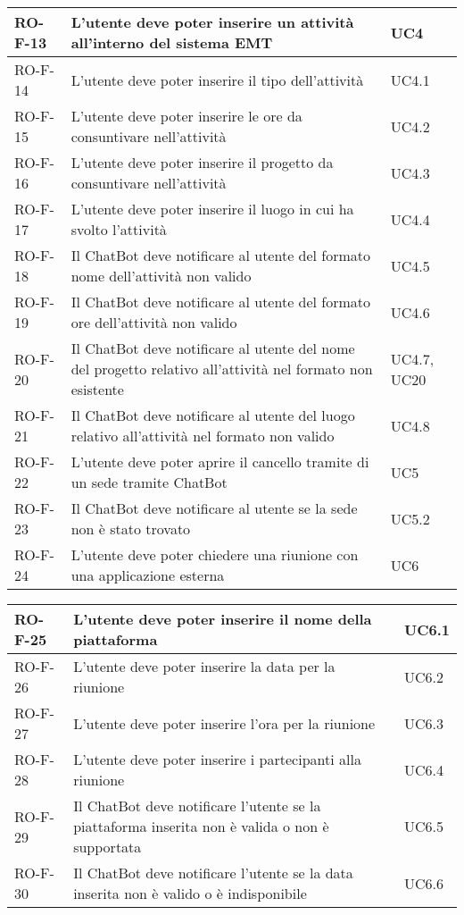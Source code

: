 \begin{center}
\begin{tabular}{ | m{8em} | m{18em} | m{12em} | }
\hline
RO-F-13&L’utente deve poter inserire un attività all’interno del sistema EMT &UC4 \\
\hline
RO-F-14&L’utente deve poter inserire il tipo dell’attività &UC4.1 \\
\hline
RO-F-15&L’utente deve poter inserire le ore da consuntivare nell’attività &UC4.2 \\
\hline  
RO-F-16&L’utente deve poter inserire il progetto da consuntivare nell’attività &UC4.3 \\
\hline
RO-F-17&L’utente deve poter inserire il luogo in cui ha svolto l’attività &UC4.4 \\
\hline
RO-F-18&Il ChatBot deve notificare al utente del formato nome dell’attività non valido &UC4.5 \\
\hline
RO-F-19&Il ChatBot deve notificare al utente del formato ore dell’attività non valido &UC4.6 \\
\hline
RO-F-20&Il ChatBot deve notificare al utente del nome del progetto relativo all’attività  nel formato non esistente &UC4.7, UC20 \\
\hline
RO-F-21&Il ChatBot deve notificare al utente del luogo relativo all’attività nel formato non valido &UC4.8 \\
\hline
RO-F-22&L’utente deve poter aprire il cancello tramite di un sede tramite ChatBot &UC5 \\
\hline
RO-F-23&Il ChatBot deve notificare al utente se la sede non è stato trovato &UC5.2 \\
\hline
RO-F-24&L’utente deve poter chiedere una riunione con una applicazione esterna &UC6 \\
\hline
\end{tabular}
\newpage
\begin{tabular}{ | m{8em} | m{18em} | m{12em} | }
\hline
RO-F-25&L’utente deve poter inserire il nome della piattaforma &UC6.1 \\
\hline
RO-F-26&L’utente deve poter inserire la data per la riunione &UC6.2 \\
\hline
RO-F-27&L’utente deve poter inserire l’ora per la riunione &UC6.3 \\
\hline
RO-F-28&L’utente deve poter inserire i partecipanti alla riunione &UC6.4 \\
\hline
RO-F-29&Il ChatBot deve notificare l’utente se la piattaforma inserita non è valida o non è supportata &UC6.5 \\
\hline
RO-F-30&Il ChatBot deve notificare l’utente se la data inserita non è valido o è indisponibile &UC6.6 \\

\end{tabular}
\end{center}
